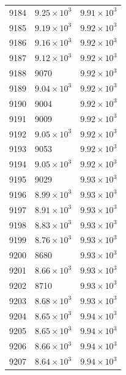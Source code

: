 \begin{table}[H]
\begin{tabular}{lll}
9184 & $\displaystyle 9.25 \times 10^{3}$ & $\displaystyle 9.91 \times 10^{3}$ \\
9185 & $\displaystyle 9.19 \times 10^{3}$ & $\displaystyle 9.92 \times 10^{3}$ \\
9186 & $\displaystyle 9.16 \times 10^{3}$ & $\displaystyle 9.92 \times 10^{3}$ \\
9187 & $\displaystyle 9.12 \times 10^{3}$ & $\displaystyle 9.92 \times 10^{3}$ \\
9188 & 9070 & $\displaystyle 9.92 \times 10^{3}$ \\
9189 & $\displaystyle 9.04 \times 10^{3}$ & $\displaystyle 9.92 \times 10^{3}$ \\
9190 & 9004 & $\displaystyle 9.92 \times 10^{3}$ \\
9191 & 9009 & $\displaystyle 9.92 \times 10^{3}$ \\
9192 & $\displaystyle 9.05 \times 10^{3}$ & $\displaystyle 9.92 \times 10^{3}$ \\
9193 & 9053 & $\displaystyle 9.92 \times 10^{3}$ \\
9194 & $\displaystyle 9.05 \times 10^{3}$ & $\displaystyle 9.92 \times 10^{3}$ \\
9195 & 9029 & $\displaystyle 9.93 \times 10^{3}$ \\
9196 & $\displaystyle 8.99 \times 10^{3}$ & $\displaystyle 9.93 \times 10^{3}$ \\
9197 & $\displaystyle 8.91 \times 10^{3}$ & $\displaystyle 9.93 \times 10^{3}$ \\
9198 & $\displaystyle 8.83 \times 10^{3}$ & $\displaystyle 9.93 \times 10^{3}$ \\
9199 & $\displaystyle 8.76 \times 10^{3}$ & $\displaystyle 9.93 \times 10^{3}$ \\
9200 & 8680 & $\displaystyle 9.93 \times 10^{3}$ \\
9201 & $\displaystyle 8.66 \times 10^{3}$ & $\displaystyle 9.93 \times 10^{3}$ \\
9202 & 8710 & $\displaystyle 9.93 \times 10^{3}$ \\
9203 & $\displaystyle 8.68 \times 10^{3}$ & $\displaystyle 9.93 \times 10^{3}$ \\
9204 & $\displaystyle 8.65 \times 10^{3}$ & $\displaystyle 9.94 \times 10^{3}$ \\
9205 & $\displaystyle 8.65 \times 10^{3}$ & $\displaystyle 9.94 \times 10^{3}$ \\
9206 & $\displaystyle 8.66 \times 10^{3}$ & $\displaystyle 9.94 \times 10^{3}$ \\
9207 & $\displaystyle 8.64 \times 10^{3}$ & $\displaystyle 9.94 \times 10^{3}$ \\

\end{tabular}
\end{table}

